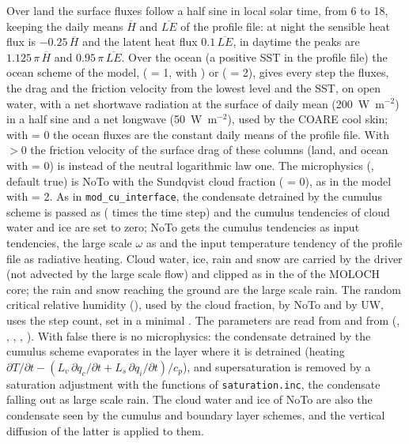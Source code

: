 Over land the surface fluxes follow a half sine in local solar time,
from 6 to 18, keeping the daily means $\overline{H}$ and
$\overline{LE}$ of the profile file: at night the sensible heat flux is
$-0.25\,\overline{H}$ and the latent heat flux $0.1\,\overline{LE}$,
in daytime the peaks are $1.125\,\pi\,\overline{H}$ and
$0.95\,\pi\,\overline{LE}$. Over the ocean (a positive SST in the
profile file) the ocean scheme of the model, 
( = 1, with ) or 
( = 2), gives every step the fluxes, the drag
 and the friction velocity from the lowest level and the
SST, on open water, with a net shortwave radiation at the surface of
daily mean  (200~W~m$^{-2}$) in a half sine and a net
longwave  (50~W~m$^{-2}$), used by the COARE cool skin;
with  = 0 the ocean fluxes are the constant daily means
of the profile file. With  $> 0$ the friction velocity of
the surface drag of these columns (land, and ocean with 
= 0) is  instead of the neutral logarithmic law one.
The microphysics (, default true) is NoTo with the Sundqvist
cloud fraction ( = 0), as in the model with
 = 2. As in \verb=mod_cu_interface=, the condensate
detrained by the cumulus scheme is passed as 
( times the time step) and the cumulus tendencies of
cloud water and ice are set to zero; NoTo gets the cumulus tendencies as
input tendencies, the large scale $\omega$ as  and the input
temperature tendency of the profile file as radiative heating. Cloud
water, ice, rain and snow are carried by the driver (not advected by the
large scale flow) and clipped as in the  of the
MOLOCH core; the rain and snow reaching the ground are the large scale
rain. The random critical relative humidity (),
used by the cloud fraction, by NoTo and by UW, uses the step count, set in
a minimal . The parameters are
read from  and from  (,
, , ,
). With  false there is no microphysics:
the condensate detrained by the cumulus scheme evaporates in the layer
where it is detrained (heating
$\partial T/\partial t - (L_v\,\partial q_c/\partial t +
L_s\,\partial q_i/\partial t)/c_p$), and supersaturation is removed by a
saturation adjustment with the functions of \verb=saturation.inc=, the
condensate falling out as large scale rain. The cloud water and ice of
NoTo are also the condensate seen by the cumulus and boundary layer
schemes, and the vertical diffusion of the latter is applied to them.

